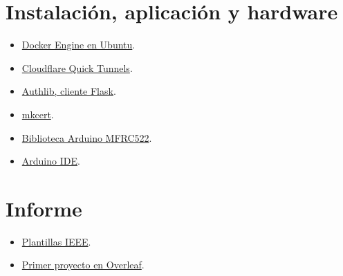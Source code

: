\documentclass[12pt,a4paper]{article}
\begin{document}
\section*{Instalación, aplicación y hardware}
\begin{itemize}
\item \href{https://docs.docker.com/engine/install/ubuntu/}{Docker Engine en Ubuntu}.
\item \href{https://developers.cloudflare.com/tunnel/get-started/quick-tunnels/}{Cloudflare Quick Tunnels}.
\item \href{https://github.com/authlib/authlib/blob/main/docs/client/flask.rst}{Authlib, cliente Flask}.
\item \href{https://github.com/FiloSottile/mkcert}{mkcert}.
\item \href{https://github.com/miguelbalboa/rfid}{Biblioteca Arduino MFRC522}.
\item \href{https://www.arduino.cc/en/software}{Arduino IDE}.
\end{itemize}
\section*{Informe}
\begin{itemize}
\item \href{https://www.ieee.org/conferences/publishing/templates.html}{Plantillas IEEE}.
\item \href{https://docs.overleaf.com/getting-started/your-first-project}{Primer proyecto en Overleaf}.
\end{itemize}
\end{document}
